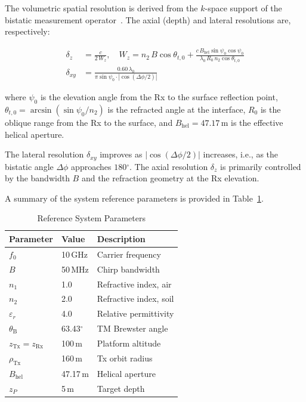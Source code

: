 \documentclass[journal]{IEEEtran}
\newcommand{\Rx}{\mathrm{Rx}}
\newcommand{\Tx}{\mathrm{Tx}}
\newcommand{\dxy}{\delta_{xy}}
\newcommand{\dz}{\delta_z}
\newcommand{\gdeg}{\ensuremath{^{\circ}}}
\newcommand{\thetaB}{\theta_{\mathrm{B}}}
\begin{document}
The volumetric spatial resolution is derived from the $k$-space support of
the bistatic measurement operator~\cite{soumekh1999, devaney1984}. The axial
(depth) and lateral resolutions are, respectively:

\begin{align}
  \dz &= \frac{c}{2\,W_z}, \quad
  W_z = n_2\,B\cos\theta_{t,0}
        + \frac{c\,B_{\mathrm{hel}}\sin\psi_0\cos\psi_0}
               {\lambda_0\,R_0\,n_2\cos\theta_{t,0}}
  \label{eq:dz} \\[4pt]
  \dxy &= \frac{0.60\,\lambda_0}
               {\pi\sin\psi_0 \cdot |\cos(\Delta\phi/2)|}
  \label{eq:dxy}
\end{align}

where $\psi_0$ is the elevation angle from the Rx to the surface reflection
point, $\theta_{t,0} = \arcsin(\sin\psi_0/n_2)$ is the refracted angle at the
interface, $R_0$ is the oblique range from the Rx to the surface, and
$B_{\mathrm{hel}} = 47.17\,\mathrm{m}$ is the effective helical aperture.

The lateral resolution $\dxy$ improves as $|\cos(\Delta\phi/2)|$ increases,
i.e., as the bistatic angle $\Delta\phi$ approaches $180\gdeg$. The axial
resolution $\dz$ is primarily controlled by the bandwidth $B$ and the
refraction geometry at the Rx elevation.

A summary of the system reference parameters is provided in
Table~\ref{tab:params}.

\begin{table}[!t]
  \renewcommand{\arraystretch}{1.2}
  \centering
  \caption{Reference System Parameters}
  \label{tab:params}
  \begin{tabular}{@{}lll@{}}
    \toprule
    \textbf{Parameter} & \textbf{Value} & \textbf{Description} \\
    \midrule
    $f_0$                  & 10\,GHz       & Carrier frequency \\
    $B$                    & 50\,MHz       & Chirp bandwidth \\
    $n_1$                  & 1.0           & Refractive index, air \\
    $n_2$                  & 2.0           & Refractive index, soil \\
    $\varepsilon_r$        & 4.0           & Relative permittivity \\
    $\thetaB$              & 63.43\gdeg    & TM Brewster angle \\
    $z_{\Tx} = z_{\Rx}$   & 100\,m        & Platform altitude \\
    $\rho_{\Tx}$           & 160\,m        & Tx orbit radius \\
    $B_{\mathrm{hel}}$     & 47.17\,m      & Helical aperture \\
    $z_P$                  & 5\,m          & Target depth \\
    \bottomrule
  \end{tabular}
\end{table}
\end{document}
